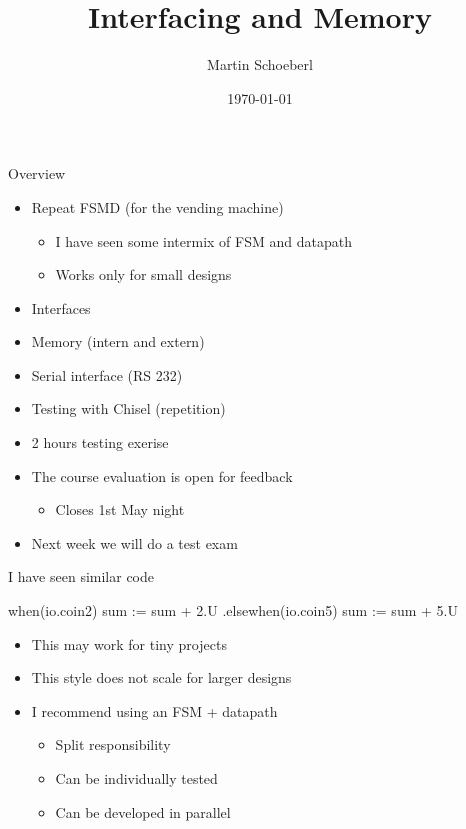 

\newif\ifbook


\title{Interfacing and Memory}
\author{Martin Schoeberl}
\date{\today}



\begin{frame}
\titlepage
\end{frame}


\begin{frame}[fragile]{Overview}
\begin{itemize}
\item Repeat FSMD (for the vending machine)
\begin{itemize}
\item I have seen some intermix of FSM and datapath
\item Works only for small designs
\end{itemize}
\item Interfaces
\item Memory (intern and extern)
\item Serial interface (RS 232)
\item Testing with Chisel (repetition)
\item 2 hours testing exerise
\item The course evaluation is open for feedback
\begin{itemize}
\item Closes 1st May night
\end{itemize}
\item Next week we will do a test exam
\end{itemize}
\end{frame}

\begin{frame}[fragile]{I have seen similar code}
\begin{chisel}
  when(io.coin2) {
    sum := sum + 2.U
  } .elsewhen(io.coin5) {
    sum := sum + 5.U
  }
\end{chisel}
\begin{itemize}
\item This may work for tiny projects
\item This style does not scale for larger designs
\item I recommend using an FSM + datapath
\begin{itemize}
\item Split responsibility
\item Can be individually tested
\item Can be developed in parallel
\end{itemize}
\end{itemize}
\end{frame}


